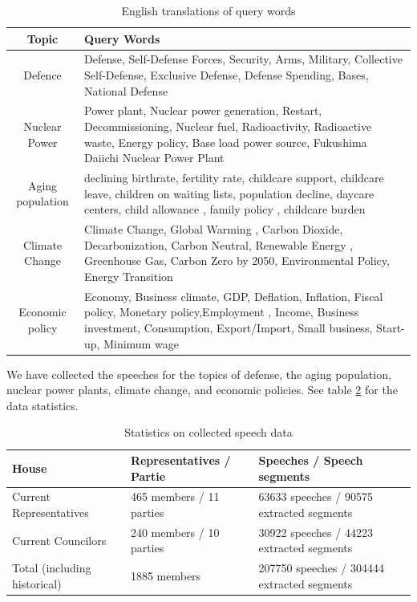 \documentclass[final,5p,times,twocolumn,authoryear]{elsarticle}
\begin{document}
\begin{table}[htbp] %
\centering
\begin{tabularx}{.45\textwidth}{ c|X } 
\hline
Topic & Query Words \\  
\hline
Defence & Defense, Self-Defense Forces, Security, Arms, Military, Collective Self-Defense, Exclusive Defense, Defense Spending, Bases, National Defense \\ 
\hline
Nuclear Power &  Power plant, Nuclear power generation, Restart, Decommissioning, Nuclear fuel, Radioactivity, Radioactive waste, Energy policy, Base load power source, Fukushima Daiichi Nuclear Power Plant \\
\hline
Aging population & declining birthrate, fertility rate, childcare support, childcare leave, children on waiting lists, population decline, daycare centers, child allowance , family policy , childcare burden \\
\hline
Climate Change & Climate Change, Global Warming , Carbon Dioxide, Decarbonization, Carbon Neutral, Renewable Energy , Greenhouse Gas, Carbon Zero by 2050, Environmental Policy, Energy Transition\\
\hline
Economic policy & Economy, Business climate, GDP, Deflation, Inflation, Fiscal policy, Monetary policy,Employment , Income, Business investment, Consumption, Export/Import, Small business, Start-up, Minimum wage\\
\hline
\end{tabularx}
\caption{English translations of query words}\label{tab:English-query}
\end{table}

We have collected the speeches for the topics of defense, the aging population, nuclear power plants, climate change, and economic policies. See table \ref{tab:stats} for the data statistics. 

\begin{table}[htbp] %
\centering
\begin{tabularx}{.45\textwidth}{ X|X|X } 
\hline
House & Representatives / Partie & Speeches / Speech segments\\  
\hline
Current Representatives & 465 members / 11 parties & 63633 speeches / 90575 extracted segments \\ 
\hline
Current Councilors & 240 members / 10 parties  & 30922 speeches / 44223 extracted segments \\
\hline
Total (including historical) & 1885 members & 207750 speeches / 304444 extracted segments\\
\hline
\end{tabularx}
\caption{Statistics on collected speech data}
\label{tab:stats}
\end{table}
\end{document}
